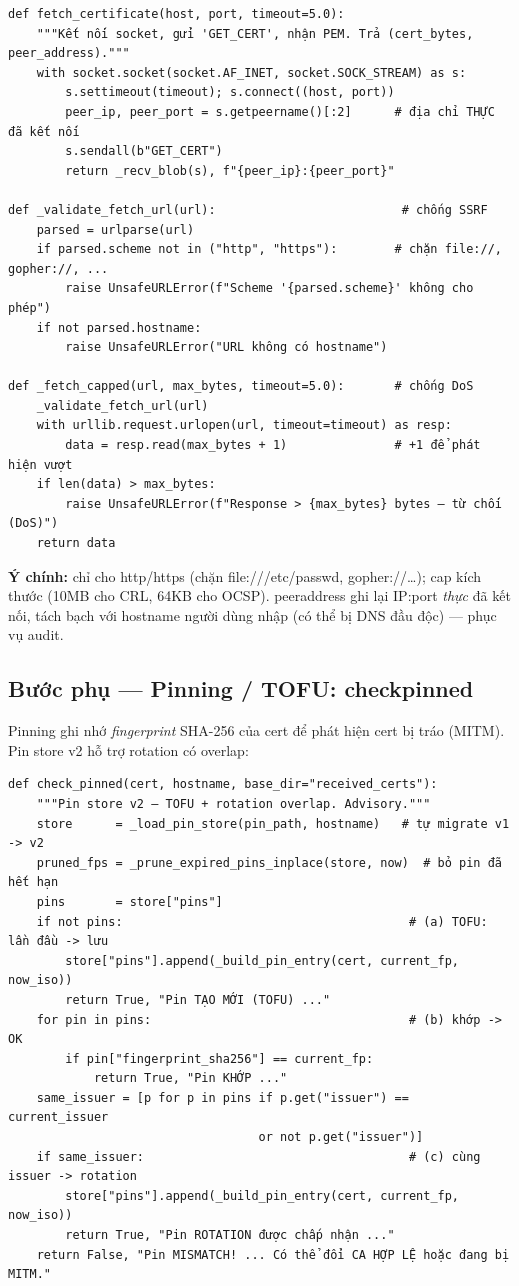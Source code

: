 \documentclass[12pt,a4paper]{article}
\newcommand{\code}[1]{{\ttfamily\small\def\_{\textunderscore\discretionary{}{}{}}#1}}
\begin{document}
\begin{Verbatim}
def fetch_certificate(host, port, timeout=5.0):
    """Kết nối socket, gửi 'GET_CERT', nhận PEM. Trả (cert_bytes, peer_address)."""
    with socket.socket(socket.AF_INET, socket.SOCK_STREAM) as s:
        s.settimeout(timeout); s.connect((host, port))
        peer_ip, peer_port = s.getpeername()[:2]      # địa chỉ THỰC đã kết nối
        s.sendall(b"GET_CERT")
        return _recv_blob(s), f"{peer_ip}:{peer_port}"

def _validate_fetch_url(url):                          # chống SSRF
    parsed = urlparse(url)
    if parsed.scheme not in ("http", "https"):        # chặn file://, gopher://, ...
        raise UnsafeURLError(f"Scheme '{parsed.scheme}' không cho phép")
    if not parsed.hostname:
        raise UnsafeURLError("URL không có hostname")

def _fetch_capped(url, max_bytes, timeout=5.0):       # chống DoS
    _validate_fetch_url(url)
    with urllib.request.urlopen(url, timeout=timeout) as resp:
        data = resp.read(max_bytes + 1)               # +1 để phát hiện vượt
    if len(data) > max_bytes:
        raise UnsafeURLError(f"Response > {max_bytes} bytes — từ chối (DoS)")
    return data
\end{Verbatim}

\textbf{Ý chính:} chỉ cho \code{http/https} (chặn \code{file:///etc/passwd},
\code{gopher://}\dots); cap kích thước (10MB cho CRL, 64KB cho OCSP). \code{peer\_address}
ghi lại IP:port \emph{thực} đã kết nối, tách bạch với hostname người dùng nhập
(có thể bị DNS đầu độc) --- phục vụ audit.

\subsection{Bước phụ --- Pinning / TOFU: \code{check\_pinned}}

Pinning ghi nhớ \emph{fingerprint} SHA-256 của cert để phát hiện cert bị tráo
(MITM). Pin store v2 hỗ trợ rotation có overlap:

\begin{Verbatim}
def check_pinned(cert, hostname, base_dir="received_certs"):
    """Pin store v2 — TOFU + rotation overlap. Advisory."""
    store      = _load_pin_store(pin_path, hostname)   # tự migrate v1 -> v2
    pruned_fps = _prune_expired_pins_inplace(store, now)  # bỏ pin đã hết hạn
    pins       = store["pins"]
    if not pins:                                        # (a) TOFU: lần đầu -> lưu
        store["pins"].append(_build_pin_entry(cert, current_fp, now_iso))
        return True, "Pin TẠO MỚI (TOFU) ..."
    for pin in pins:                                    # (b) khớp -> OK
        if pin["fingerprint_sha256"] == current_fp:
            return True, "Pin KHỚP ..."
    same_issuer = [p for p in pins if p.get("issuer") == current_issuer
                                   or not p.get("issuer")]
    if same_issuer:                                     # (c) cùng issuer -> rotation
        store["pins"].append(_build_pin_entry(cert, current_fp, now_iso))
        return True, "Pin ROTATION được chấp nhận ..."
    return False, "Pin MISMATCH! ... Có thể đổi CA HỢP LỆ hoặc đang bị MITM."
\end{Verbatim}
\end{document}
